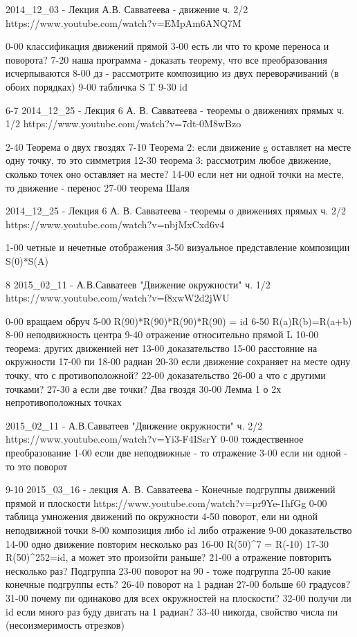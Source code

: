 2014_12_03 - Лекция А.В. Савватеева - движение ч. 2/2
https://www.youtube.com/watch?v=EMpAm6ANQ7M

0-00 классификация движений прямой
3-00 есть ли что то кроме переноса и поворота?
7-20 наша программа - доказать теорему, что все преобразования исчерпываются
8-00 дз - рассмотрите композицию из двух переворачиваний (в обоих порядках)
9-00 табличка S T
9-30 id

6-7
2014_12_25 - Лекция 6 А. В. Савватеева - теоремы о движениях прямых ч. 1/2
https://www.youtube.com/watch?v=7dt-0M8wBzo

2-40 Теорема о двух гвоздях
7-10 Теорема 2: если движение g оставляет на месте одну точку, то это симметрия
12-30 теорема 3: рассмотрим любое движение, сколько точек оно оставляет на месте?
14-00 если нет ни одной точки на месте, то движение - перенос
27-00 теорема Шаля


2014_12_25 - Лекция 6 А. В. Савватеева - теоремы о движениях прямых ч. 2/2
https://www.youtube.com/watch?v=nbjMxCxd6v4

1-00 четные и нечетные отображения
3-50 визуальное представление композиции S(0)*S(A)

8
2015_02_11 - А.В.Савватеев "Движение окружности" ч. 1/2
https://www.youtube.com/watch?v=f8xwW2d2jWU

0-00 вращаем обруч
5-00 R(90)*R(90)*R(90)*R(90) = id
6-50 R(a)R(b)=R(a+b)
8-00 неподвижность центра
9-40 отражение относительно прямой L
10-00 теорема: других движенией нет
13-00 доказательство
15-00 расстояние на окружности
17-00 пи
18-00 радиан
20-30 если движение сохраняет на месте одну точку, что с противоположной?
22-00 доказательство
26-00 а что с другими точками?
27-30 а если две точки? Два гвоздя
30-00 Лемма 1 о 2х непротивоположных точках

2015_02_11 - А.В.Савватеев "Движение окружности" ч. 2/2
https://www.youtube.com/watch?v=Yi3-F4ISsrY
0-00 тождественное преобразование
1-00 если две неподвижные - то отражение
3-00 если ни одной - то это поворот

9-10
2015_03_16 - лекция А. В. Савватеева - Конечные подгруппы движений прямой и плоскости
https://www.youtube.com/watch?v=pr9Ye-1hfGg
0-00 таблица умножения движений по окружности
4-50 поворот, ели ни одной неподвижной точки
8-00 композиция либо id либо отражение
9-00 доказательство
14-00 одно движение повторим несколько раз
16-00 R(50)^7 = R(-10)
17-30 R(50)^252=id, а может это произойти раньше?
21-00 а отражение повторить несколько раз? Подгруппа
23-00 поворот на 90 - тоже подгруппа
25-00 какие конечные подгруппы есть?
26-40 поворот на 1 радиан
27-00 больше 60 градусов?
31-00 почему пи одинаково для всех окружностей на плоскости?
32-00 получи ли id если много раз буду двигать на 1 радиан?
33-40 никогда, свойство числа пи (несоизмеримость отрезков)

